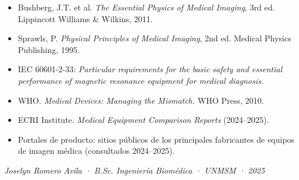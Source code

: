 \documentclass[11pt, a4paper]{article}
\begin{document}
\vspace{4pt}
\begin{itemize}[leftmargin=*, itemsep=3pt]
  \item Bushberg, J.T. et al. \textit{The Essential Physics of Medical Imaging}, 3rd ed.
        Lippincott Williams \& Wilkins, 2011.
  \item Sprawls, P. \textit{Physical Principles of Medical Imaging}, 2nd ed.
        Medical Physics Publishing, 1995.
  \item IEC 60601-2-33: \textit{Particular requirements for the basic safety and essential
        performance of magnetic resonance equipment for medical diagnosis.}
  \item WHO. \textit{Medical Devices: Managing the Mismatch.} WHO Press, 2010.
  \item ECRI Institute. \textit{Medical Equipment Comparison Reports} (2024--2025).
  \item Portales de producto: sitios públicos de los principales fabricantes de
        equipos de imagen médica (consultados 2024--2025).
\end{itemize}

\vspace{16pt}
\noindent{\color{graybrd}\rule{\linewidth}{0.5pt}}
\vspace{6pt}

\noindent\small\color{graym}
\textit{Joselyn Romero Avila · B.Sc. Ingeniería Biomédica · UNMSM · 2025}
\end{document}
